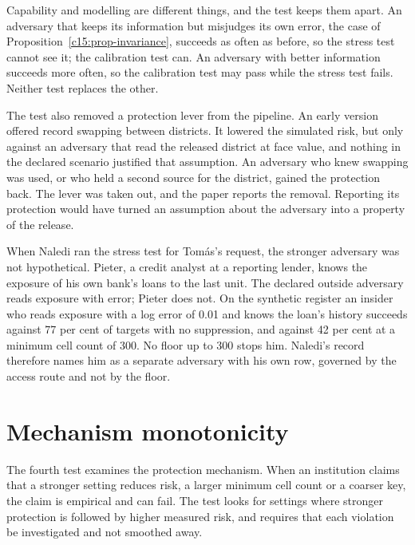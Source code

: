 Capability and modelling are different things, and the test keeps them apart. An
adversary that keeps its information but misjudges its own error, the case of
Proposition~\ref{c15:prop-invariance}, succeeds as often as before, so the stress
test cannot see it; the calibration test can. An adversary with better information
succeeds more often, so the calibration test may pass while the stress test fails.
Neither test replaces the other.

The test also removed a protection lever from the pipeline. An early version
offered record swapping between districts. It lowered the simulated risk, but only
against an adversary that read the released district at face value, and nothing in
the declared scenario justified that assumption. An adversary who knew swapping
was used, or who held a second source for the district, gained the protection
back. The lever was taken out, and the paper reports the removal. %
Reporting its protection would have turned an assumption about the adversary into
a property of the release.

When Naledi ran the stress test for Tomás's request, the stronger adversary was not
hypothetical. Pieter, a credit analyst at a reporting lender, knows the exposure of
his own bank's loans to the last unit. The declared outside adversary reads
exposure with error; Pieter does not. On the synthetic register an insider who reads
exposure with a log error of 0.01 and knows the loan's history succeeds against
77 per cent of targets with no suppression, and against 42 per cent at a minimum
cell count of 300. %
No floor up to 300 stops him. Naledi's record therefore names him as a separate
adversary with his own row, governed by the access route and not by the floor.

\section{Mechanism monotonicity}

The fourth test examines the protection mechanism. When an institution claims that
a stronger setting reduces risk, a larger minimum cell count or a coarser key, the
claim is empirical and can fail. The test looks for settings where stronger
protection is followed by higher measured risk, and requires that each violation
be investigated and not smoothed away.

